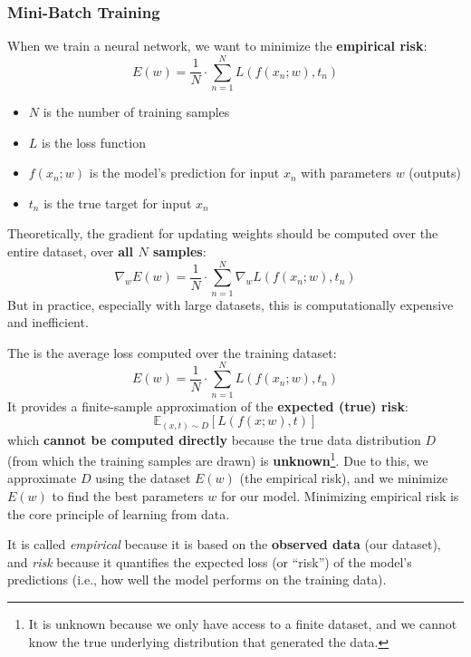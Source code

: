 \subsubsection{Mini-Batch Training}\label{sec:mini-batch-training}

When we train a neural network, we want to minimize the \textbf{empirical risk}:
\begin{equation*}
    E(w) = \frac{1}{N} \cdot \sum_{n=1}^{N} L\left(f\left(x_n; w\right), t_n\right)
\end{equation*}
\begin{itemize}
    \item $N$ is the number of training samples
    \item $L$ is the loss function
    \item $f(x_n; w)$ is the model's prediction for input $x_n$ with parameters $w$ (outputs)
    \item $t_n$ is the true target for input $x_n$
\end{itemize}
Theoretically, the gradient for updating weights should be computed over the entire dataset, over \textbf{all $N$ samples}:
\begin{equation*}
    \nabla_w E(w) = \frac{1}{N} \cdot \sum_{n=1}^{N} \nabla_w L\left(f\left(x_n; w\right), t_n\right)
\end{equation*}
But in practice, especially with large datasets, this is computationally expensive and inefficient.

\highspace
\begin{definitionbox}
    The  is the average loss computed over the training dataset:
    \begin{equation*}
        E(w) = \frac{1}{N} \cdot \sum_{n=1}^{N} L\left(f(x_n; w), t_n\right)
    \end{equation*}
    It provides a finite-sample approximation of the \textbf{expected (true) risk}:
    \begin{equation*}
        \mathbb{E}_{(x,t)\sim D}\left[L(f(x; w), t)\right]
    \end{equation*}
    which \textbf{cannot be computed directly} because the true data distribution $D$ (from which the training samples are drawn) is \textbf{unknown}\footnote{%
        It is unknown because we only have access to a finite dataset, and we cannot know the true underlying distribution that generated the data.
    }. Due to this, we approximate $D$ using the dataset $E(w)$ (the empirical risk), and we minimize $E(w)$ to find the best parameters $w$ for our model. Minimizing empirical risk is the core principle of learning from data.

    \highspace
    It is called \emph{empirical} because it is based on the \textbf{observed data} (our dataset), and \emph{risk} because it quantifies the expected loss (or ``risk'') of the model's predictions (i.e., how well the model performs on the training data).
\end{definitionbox}

